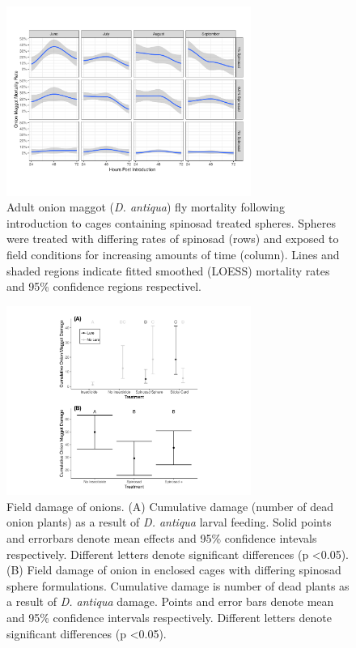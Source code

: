 \documentclass[alpha-refs]{wiley-article}
\begin{document}
\begin{figure}[bt]
\centering
\includegraphics[width = 8cm]{figures/final-figures/figure-3.pdf}
\caption{Adult onion maggot (\textit{D. antiqua}) fly mortality following introduction to cages containing spinosad treated spheres.  Spheres were treated with differing rates of spinosad (rows) and exposed to field conditions for increasing amounts of time (column).  Lines and shaded regions indicate fitted smoothed (LOESS) mortality rates and 95\% confidence regions respectivel.  }
\label{fig:figure3}
\end{figure}


\begin{figure}[bt]
\centering
\includegraphics[width = 8cm]{figures/final-figures/figure-4.pdf}
\caption{Field damage of onions.  (A) Cumulative damage (number of dead onion plants) as a result of \textit{D. antiqua} larval feeding.  Solid points and errorbars denote mean effects and 95\% confidence intevals respectively.  Different letters denote significant differences (p \textless 0.05).  (B) Field damage of onion in enclosed cages with differing spinosad sphere formulations.  Cumulative damage is number of dead plants as a result of \textit{D. antiqua} damage.  Points and error bars denote mean and 95\% confidence intervals respectively.  Different letters denote significant differences (p \textless 0.05). } 
\label{fig:figure4}
\end{figure}
\end{document}
